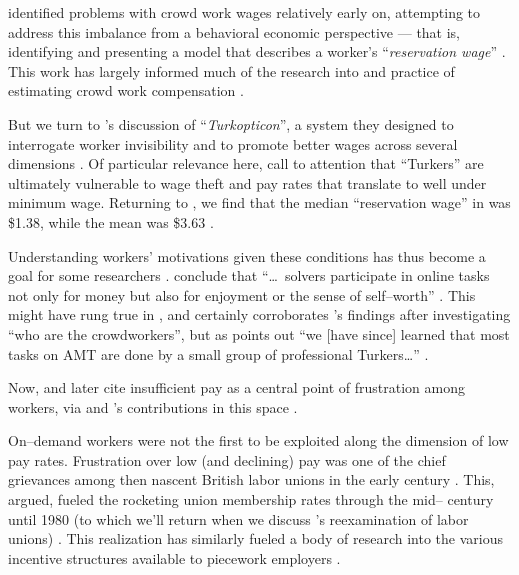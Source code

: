 \documentclass[trackingWork]{subfiles}
\begin{document}
{\citeauthor{laborEconomicsOfCrowdsourcingHorton}
identified problems with crowd work wages relatively early on,
attempting to address this imbalance from a behavioral economic perspective ---
that is, identifying and presenting a model that describes a worker's
``\textit{reservation wage}''
\cite{laborEconomicsOfCrowdsourcingHorton}.
This work has largely informed much of the research into and practice of estimating crowd work compensation
\cite{incentivesShaw,paolacci2010running}.

But we turn to \citeauthor{turkopticon}'s discussion of ``\textit{Turkopticon}'',
a system they designed to interrogate worker invisibility and to promote better wages across several dimensions
\cite{turkopticon}.
Of particular relevance here,
\citeauthor{turkopticon} call to attention that ``Turkers'' are ultimately vulnerable to
wage theft and
pay rates that translate to well under minimum wage.
Returning to \citeauthor{laborEconomicsOfCrowdsourcingHorton},
we find that the median ``reservation wage'' in \citeyear{laborEconomicsOfCrowdsourcingHorton}
was \$1.38, while the mean was \$3.63
\cite{laborEconomicsOfCrowdsourcingHorton}.

Understanding workers' motivations given these conditions has thus become a goal for some researchers
\cite{whyWouldAnyoneBrewer}.
\citeauthor{Sun20111033} conclude that
``\dots~solvers participate in online tasks
not only for money
but also for enjoyment
or the sense of self--worth''
\cite{Sun20111033}.
This might have rung true in \citeyear{Sun20111033},
and certainly corroborates \citeauthor{Ross}'s findings after investigating
``who are the crowdworkers'',
but as \citeauthor{whoareNOTtheTurkers} points out
``we [have since] learned that most tasks on AMT are done by a small group of professional Turkers\dots''
\cite{Ross,whoareNOTtheTurkers}.

Now, \citeauthor{turkopticon}
and later
\citeauthor{dynamo} cite insufficient pay as a central point of frustration among workers,
via \citeauthor{irani2015cultural} and \citeauthor{dawnDigitalSweatshopCushing}'s contributions in this space
\cite{dynamo,irani2015cultural,dawnDigitalSweatshopCushing,turkopticon}.

On--demand workers were not the first to be exploited along the dimension of low pay rates.
Frustration over low (and declining) pay was one of the chief grievances among then nascent
British labor unions in the early  century
\cite{turner1952trade}.
This, \citeauthor{ebbinghaus1999institutions} argued,
fueled the rocketing union membership rates through the mid-- century until 1980
(to which we'll return when we discuss \citeauthor{levi2009union}'s reexamination of labor unions)
\cite{ebbinghaus1999institutions,levi2009union}.
This realization has similarly fueled a body of research into
the various incentive structures available to piecework employers
\cite{roy1953work}.


}
\end{document}

